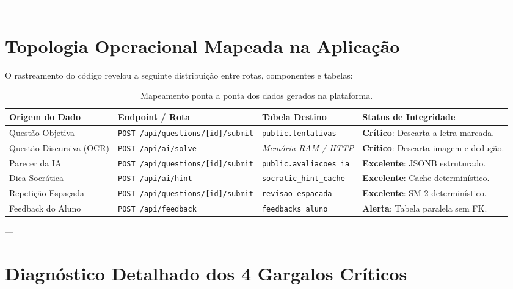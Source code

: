 \documentclass[11pt,a4paper]{article}
\begin{document}
---

\section{Topologia Operacional Mapeada na Aplicação}

O rastreamento do código revelou a seguinte distribuição entre rotas, componentes e tabelas:

\begin{table}[h!]
\centering
\footnotesize
\renewcommand{\arraystretch}{1.25}
\begin{tabularx}{\textwidth}{p{2.4cm} p{4.1cm} p{3.4cm} X}
\toprule
\textbf{Origem do Dado} & \textbf{Endpoint / Rota} & \textbf{Tabela Destino} & \textbf{Status de Integridade} \\
\midrule
Questão Objetiva & \texttt{POST /api/questions/}\newline\texttt{[id]/submit} & \texttt{public.tentativas} & \textcolor{alertRed}{\textbf{Crítico}}: Descarta a letra marcada. \\
Questão Discursiva (OCR) & \texttt{POST /api/ai/solve} & \textit{Memória RAM / HTTP} & \textcolor{alertRed}{\textbf{Crítico}}: Descarta imagem e dedução. \\
Parecer da IA & \texttt{POST /api/questions/}\newline\texttt{[id]/submit} & \texttt{public.avaliacoes\_ia} & \textcolor{successGreen}{\textbf{Excelente}}: JSONB estruturado. \\
Dica Socrática & \texttt{POST /api/ai/hint} & \texttt{socratic\_hint\_cache} & \textcolor{successGreen}{\textbf{Excelente}}: Cache determinístico. \\
Repetição Espaçada & \texttt{POST /api/questions/}\newline\texttt{[id]/submit} & \texttt{revisao\_espacada} & \textcolor{successGreen}{\textbf{Excelente}}: SM-2 determinístico. \\
Feedback do Aluno & \texttt{POST /api/feedback} & \texttt{feedbacks\_aluno} & \textcolor{lemmasDarkGold}{\textbf{Alerta}}: Tabela paralela sem FK. \\
\bottomrule
\end{tabularx}
\caption{Mapeamento ponta a ponta dos dados gerados na plataforma.}
\end{table}

---

\section{Diagnóstico Detalhado dos 4 Gargalos Críticos}
\end{document}
